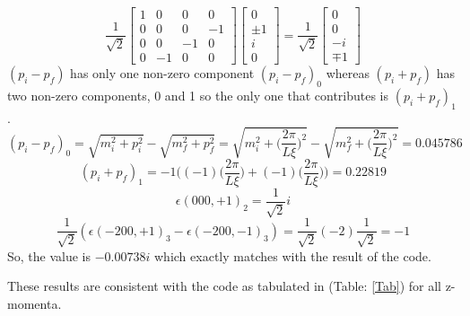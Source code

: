 \documentclass[10pt]{article}
\begin{document}
\begin{enumerate}
\[ 
\frac{1}{\sqrt{2}}
\begin{bmatrix} 
1&0&0&0\\
0&0 & 0 & -1\\
0&0 & -1 & 0\\
0&-1 & 0 & 0
\end{bmatrix} 
\begin{bmatrix}
0\\
\pm1\\
i\\
0
\end{bmatrix} 
= \frac{1}{\sqrt{2}}
\begin{bmatrix}
0\\
0\\
-i\\
\mp 1
\end{bmatrix} 
\]
$(p_i - p_f)$ has only one non-zero component $(p_i - p_f)_0$ whereas $(p_i + p_f)$ has two non-zero components, 0 and 1 so the only one that contributes is $(p_i + p_f)_1$. 
\begin{equation}
(p_i - p_f)_0 = \sqrt{m_i^2 + p_i^2} - \sqrt{m_f^2 + p_f^2} = \sqrt{m_i^2 + \Bigg(\frac{2\pi}{L\xi}\Bigg)^2} - \sqrt{m_f^2 + \Bigg( \frac{2\pi}{L\xi}\Bigg)^2} = 0.045786 
\end{equation}
\begin{equation}
(p_i + p_f)_1 = -1 \Bigg(  (-1) \Bigg(\frac{2\pi}{L\xi}\Bigg) + (-1) \Bigg( \frac{2\pi}{L\xi} \Bigg ) \Bigg) = 0.22819
\end{equation}
\begin{equation}
\epsilon(000, +1)_2 = \frac{1}{\sqrt{2}}i
\end{equation}
\begin{equation}
\frac{1}{\sqrt{2}}(\epsilon(-200, +1)_ 3 - \epsilon(-200, -1)_ 3)= \frac{1}{\sqrt{2}}(-2) \frac{1}{\sqrt{2}} = -1
\end{equation}
So, the value is $-0.00738i$ which exactly matches with the result of the code.
\end{enumerate}
These results are {\color{red}consistent} with the code as tabulated in (Table: \ref{Tab}) for all z-momenta.
\end{document}
